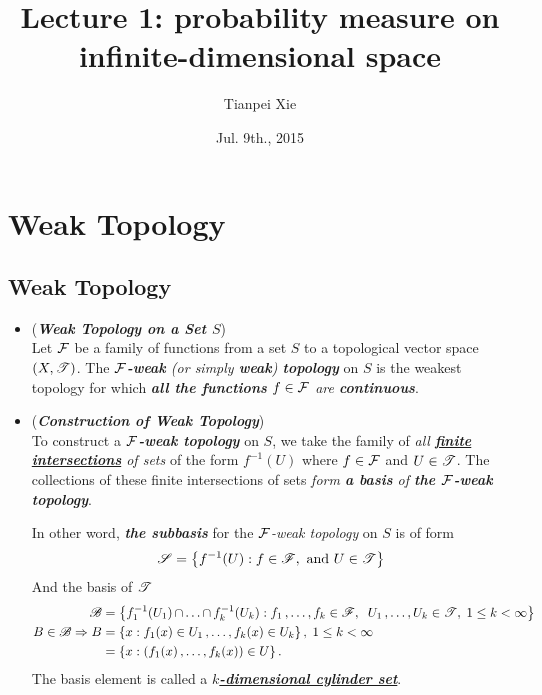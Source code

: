 \documentclass[11pt]{article}
\begin{document}
\title{Lecture 1: probability measure on infinite-dimensional space}
\author{ Tianpei Xie}
\date{ Jul. 9th., 2015 }
\maketitle
\tableofcontents
\newpage
\section{Weak Topology}
\subsection{Weak Topology}
\begin{itemize}
\item \begin{definition} (\textbf{\emph{Weak Topology on a Set $S$}})  \citep{reed1980methods}\\
Let ${\mathcal F}$ be a family of functions from a set $S$ to a topological vector space $(X, {\mathscr T})$. The \emph{\textbf{${\mathcal F}$-weak} (or simply \textbf{weak}) \textbf{topology}} on $S$ is the weakest topology for which \emph{\textbf{all the functions} $f \in {\mathcal F}$ are \textbf{continuous}}.
\end{definition}

\item \begin{remark} (\emph{\textbf{Construction of Weak Topology}}) \citep{reed1980methods} \\
To construct a \emph{\textbf{${\mathcal F}$-weak topology}} on $S$, we take the family of \emph{all \underline{\textbf{finite intersections}} of sets} of the form $f^{-1}(U)$ where $f \in {\mathcal F}$ and $U \in {\mathscr T}$. The collections of these finite intersections of sets \emph{form \textbf{a basis} of \textbf{the ${\mathcal F}$-weak topology}}.

In other word, \emph{\textbf{the subbasis}} for the \emph{${\mathcal F}$-weak topology} on $S$ is of form 
\begin{align*}
{\mathscr S} = \left\{f^{-1}(U):  f \in {\mathscr F}, \text{ and }  U \in {\mathscr T}\right\}
\end{align*}
And the basis of ${\mathscr T}$
\begin{align*}
{\mathscr B} &= \left\{f_1^{-1}(U_1) \,{\cap}\ldots{\cap}\, f_k^{-1}(U_k): f_1 \,{,}\ldots{,}\, f_k \in {\mathscr F}, \;\; U_1 \,{,}\ldots{,}\, U_k \in {\mathscr T}, \;1 \le k < \infty\right\}\\
B \in {\mathscr B} \Rightarrow B &= \left\{x: f_1(x) \in U_1 \,{,}\ldots{,}\, f_k(x) \in U_k\right\},\; 1 \le k < \infty \\
&= \left\{x: (f_1(x) \,{,}\ldots{,}\, f_k(x)) \in U\right\}.
\end{align*} The basis element is called a \underline{\emph{\textbf{$k$-dimensional cylinder set}}}.
\end{remark}


\end{itemize}
\end{document}
